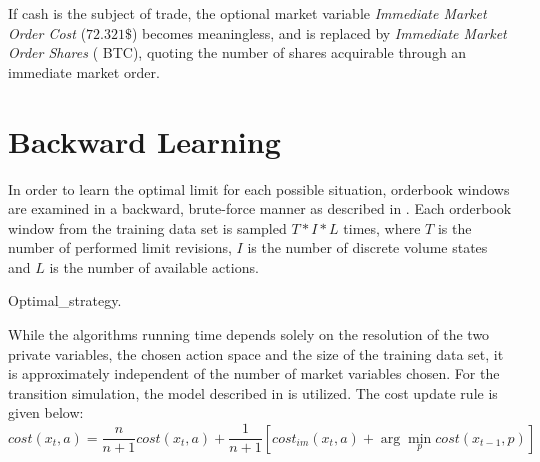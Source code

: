 If cash is the subject of trade, the optional market variable \emph{Immediate Market Order Cost}  (\eg $72.321\$$) becomes meaningless, and is replaced by \emph{Immediate Market Order Shares} ( BTC), quoting the number of shares acquirable through an immediate market order.



\section{Backward Learning}
\label{chap:backwardlearning}
In order to learn the optimal limit for each possible situation, orderbook windows are examined in a backward, brute-force manner as described in . Each orderbook window from the training data set is sampled $T*I*L$ times, where $T$ is the number of performed limit revisions, $I$ is the number of discrete volume states and $L$ is the number of available actions.\\

\begin{algorithm}[H] 
 \caption{Optimal\_strategy\Cite{Nevmyvaka:2006}.}
     \SetAlgoLined
     \footnotesize
     

\label{alg:bruteforce:pseudocode}
\end{algorithm}\bigskip

While the algorithms running time depends solely on the resolution of the two private variables, the chosen action space and the size of the training data set, it is approximately independent of the number of market variables chosen. For the transition simulation, the model described in  is utilized. The cost update rule is given below: 
\begin{equation}\label{eq:costfunction}
   cost(x_t, a) = \dfrac{n}{n+1} cost(x_t, a) + \dfrac{1}{n+1} [cost_{im}(x_t,a) + \arg\min_{p}cost(x_{t-1}, p)]
\end{equation}

